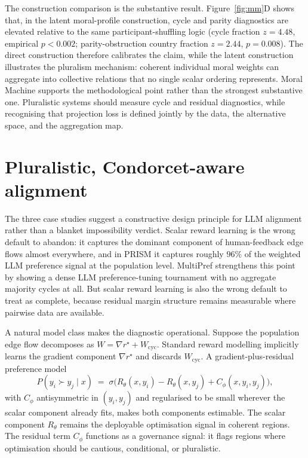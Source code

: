 \documentclass[10pt]{article}
\theoremstyle{definition}
\theoremstyle{remark}
\begin{document}
The construction comparison is the substantive result. Figure~\ref{fig:mm}D shows that, in the latent moral-profile construction, cycle and parity diagnostics are elevated relative to the same participant-shuffling logic (cycle fraction $z=4.48$, empirical $p<0.002$; parity-obstruction country fraction $z=2.44$, $p=0.008$). The direct construction therefore calibrates the claim, while the latent construction illustrates the pluralism mechanism: coherent individual moral weights can aggregate into collective relations that no single scalar ordering represents. Moral Machine supports the methodological point rather than the strongest substantive one. Pluralistic systems should measure cycle and residual diagnostics, while recognising that projection loss is defined jointly by the data, the alternative space, and the aggregation map.

\section{Pluralistic, Condorcet-aware alignment}
\label{sec:alignment}

The three case studies suggest a constructive design principle for LLM alignment rather than a blanket impossibility verdict. Scalar reward learning is the wrong default to abandon: it captures the dominant component of human-feedback edge flows almost everywhere, and in PRISM it captures roughly $96\%$ of the weighted LLM preference signal at the population level. MultiPref strengthens this point by showing a dense LLM preference-tuning tournament with no aggregate majority cycles at all. But scalar reward learning is also the wrong default to treat as complete, because residual margin structure remains measurable where pairwise data are available.

A natural model class makes the diagnostic operational. Suppose the population edge flow decomposes as $W = \nabla r^\star + W_{\mathrm{cyc}}$. Standard reward modelling implicitly learns the gradient component $\nabla r^\star$ and discards $W_{\mathrm{cyc}}$. A gradient-plus-residual preference model
\begin{equation}
P(y_i \succ y_j \mid x) \;=\; \sigma\!\bigl(R_\theta(x, y_i)-R_\theta(x, y_j) + C_\phi(x, y_i, y_j)\bigr),
\label{eq:cap}
\end{equation}
with $C_\phi$ antisymmetric in $(y_i, y_j)$ and regularised to be small wherever the scalar component already fits, makes both components estimable. The scalar component $R_\theta$ remains the deployable optimisation signal in coherent regions. The residual term $C_\phi$ functions as a governance signal: it flags regions where optimisation should be cautious, conditional, or pluralistic.
\end{document}
